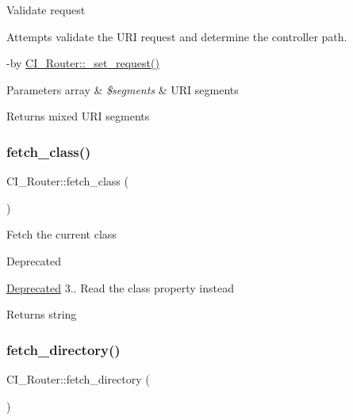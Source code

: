 Validate request

Attempts validate the U\+RI request and determine the controller path.

-\/by \mbox{\hyperlink{class_c_i___router_a686a9ad1e27d85cec9bb4e11285c8906}{C\+I\+\_\+\+Router\+::\+\_\+set\+\_\+request()}} 
\begin{DoxyParams}[1]{Parameters}
array & {\em \$segments} & U\+RI segments \\
\hline
\end{DoxyParams}
\begin{DoxyReturn}{Returns}
mixed U\+RI segments 
\end{DoxyReturn}
\mbox{\label{class_c_i___router_a8aa125a391633531057aca68bf1eb81b}} 
\subsubsection{\texorpdfstring{fetch\+\_\+class()}{fetch\_class()}}
{\footnotesize\ttfamily C\+I\+\_\+\+Router\+::fetch\+\_\+class (\begin{DoxyParamCaption}{ }\end{DoxyParamCaption})}

Fetch the current class

\begin{DoxyRefDesc}{Deprecated}
\item[\mbox{\hyperlink{deprecated__deprecated000003}{Deprecated}}]3.. Read the \textquotesingle{}class\textquotesingle{} property instead \end{DoxyRefDesc}
\begin{DoxyReturn}{Returns}
string 
\end{DoxyReturn}
\mbox{\label{class_c_i___router_a2a9a8224fcd4a7b035b590018179e7e6}} 
\subsubsection{\texorpdfstring{fetch\+\_\+directory()}{fetch\_directory()}}
{\footnotesize\ttfamily C\+I\+\_\+\+Router\+::fetch\+\_\+directory (\begin{DoxyParamCaption}{ }\end{DoxyParamCaption})}

